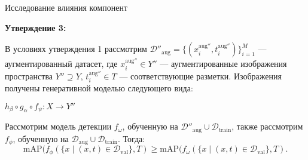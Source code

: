 \documentclass{beamer}
\begin{document}
\begin{frame}{Исследование влияния компонент}

\textbf{Утверждение 3:}\par

В условиях утверждения 1 рассмотрим $\mathcal{D''}_{\text{aug}} = \{(x_i^{\text{aug}''}, t_i^{\text{aug}''})\}_{i=1}^{M} $ — аугментированный датасет, где \( x_i^{\text{aug}''} \in Y''\) — аугментированные изображения пространства $Y'' \supseteq Y$, \( t_i^{\text{aug}''} \in T \) — соответствующие разметки. Изображения получены генеративной моделью следующего вида:

\begin{center}
$ h_{\beta} \circ g_{\alpha} \circ f_{\psi}: X \to Y''$
\end{center}


Рассмотрим модель детекции $f_{\omega}$, обученную на $\mathcal{D''}_{\text{aug}} \cup \mathcal{D}_{\text{train}}$, также рассмотрим $f_{\phi}$, обученную на $\mathcal{D}_{\text{aug}} \cup \mathcal{D}_{\text{train}}$. Тогда:
\[
{\text{mAP}}(f_{\phi}(\{ x \mid (x, t) \in  \mathcal{D}_{\text{val}}\}, T) \geq {\text{mAP}}(f_{\omega}(\{ x \mid (x, t) \in  \mathcal{D}_{\text{val}}\}, T).
\]

\end{frame}
\end{document}
